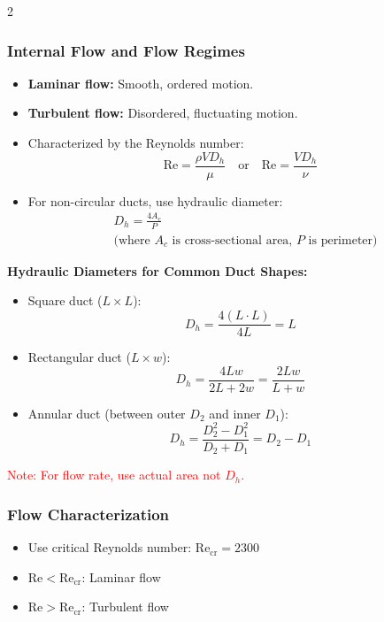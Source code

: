 \begin{multicols*}{2}
    \subsubsection{Internal Flow and Flow Regimes}
    \begin{itemize}
        \item \textbf{Laminar flow:} Smooth, ordered motion.
        \item \textbf{Turbulent flow:} Disordered, fluctuating motion.
        \item Characterized by the Reynolds number:
              \[
                  \text{Re} = \frac{\rho V D_h}{\mu} \quad \text{or} \quad \text{Re} = \frac{V D_h}{\nu}
              \]
        \item For non-circular ducts, use hydraulic diameter:
              \begin{align*}
                   & D_h = \frac{4A_c}{P}                                           \\
                   & \text{(where $A_c$ is cross-sectional area, $P$ is perimeter)}
              \end{align*}
    \end{itemize}

    \textbf{Hydraulic Diameters for Common Duct Shapes:}
    \begin{itemize}
        \item Square duct ($L \times L$):
              \[
                  D_h = \frac{4(L \cdot L)}{4L} = L
              \]
        \item Rectangular duct ($L \times w$):
              \[
                  D_h = \frac{4Lw}{2L + 2w} = \frac{2Lw}{L + w}
              \]
        \item Annular duct (between outer $D_2$ and inner $D_1$):
              \[
                  D_h = \frac{D_2^2 - D_1^2}{D_2 + D_1} = D_2 - D_1
              \]
    \end{itemize}

    \textcolor{red}{Note: For flow rate, use actual area not $D_h$.}

    \subsubsection{Flow Characterization}
    \begin{itemize}
        \item Use critical Reynolds number: $\text{Re}_{\text{cr}} = 2300$
        \item $\text{Re} < \text{Re}_{\text{cr}}$: Laminar flow
        \item $\text{Re} > \text{Re}_{\text{cr}}$: Turbulent flow
    \end{itemize}


\end{multicols*}
